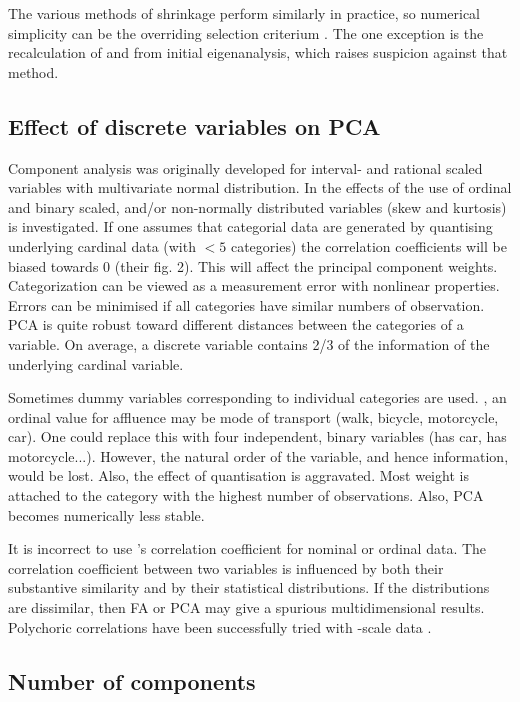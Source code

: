 The various methods of shrinkage perform similarly in practice, so numerical simplicity can be the overriding selection criterium \parencite{Dis-07}. The one exception is the recalculation of  and  from initial eigenanalysis, which raises suspicion against that method.

\subsection{Effect of discrete variables on PCA}

Component analysis was originally developed for interval- and rational scaled variables with multivariate normal distribution. In \parencite{Kol-04} the effects of the use of ordinal and binary scaled, and/or non-normally distributed variables (skew and kurtosis) is investigated. If one assumes that categorial data are generated by quantising underlying cardinal data (with \( < 5 \) categories) the correlation coefficients will be biased towards 0 (their fig. 2). This will affect the principal component weights. Categorization can be viewed as a measurement error with nonlinear properties. Errors can be minimised if all categories have similar numbers of observation. \acs{PCA} is quite robust toward different distances between the categories of a variable.  On average, a discrete variable contains 2/3 of the information of the underlying cardinal variable.

Sometimes dummy variables corresponding to individual categories are used. , an ordinal value for affluence may be mode of transport (walk, bicycle, motorcycle, car). One could replace this with four independent, binary variables (has car, has motorcycle...). However, the natural order of the variable, and hence information, would be lost. Also, the effect of quantisation is aggravated. Most weight is attached to the category with the highest number of observations. Also, \acs{PCA} becomes numerically less stable.

It is incorrect to use 's correlation coefficient for nominal or ordinal data. The correlation coefficient between two variables is influenced by both their substantive similarity and by their statistical distributions. If the distributions are dissimilar, then \acs{FA} or \acs{PCA} may give a spurious multidimensional results. Polychoric correlations have been successfully tried with -scale data \parencite{Bas-12}.

\subsection{Number of components}

